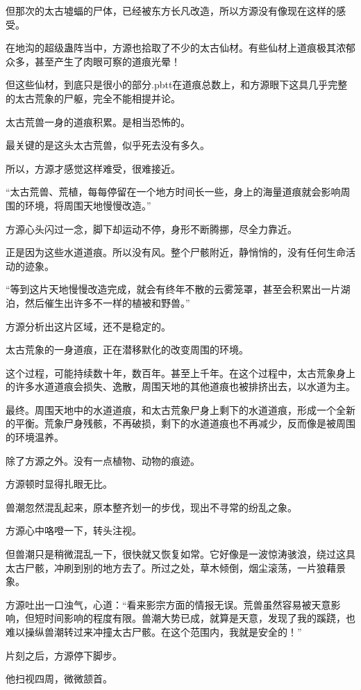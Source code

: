 \begin{this_body}
但那次的太古墟蝠的尸体，已经被东方长凡改造，所以方源没有像现在这样的感受。

在地沟的超级蛊阵当中，方源也拾取了不少的太古仙材。有些仙材上道痕极其浓郁众多，甚至产生了肉眼可察的道痕光晕！

但这些仙材，到底只是很小的部分.pbtt在道痕总数上，和方源眼下这具几乎完整的太古荒象的尸躯，完全不能相提并论。

太古荒兽一身的道痕积累。是相当恐怖的。

最关键的是这头太古荒兽，似乎死去没有多久。

所以，方源才感觉这样难受，很难接近。

“太古荒兽、荒植，每每停留在一个地方时间长一些，身上的海量道痕就会影响周围的环境，将周围天地慢慢改造。”

方源心头闪过一念，脚下却运动不停，身形不断腾挪，尽全力靠近。

正是因为这些水道道痕。所以没有风。整个尸骸附近，静悄悄的，没有任何生命活动的迹象。

“等到这片天地慢慢改造完成，就会有终年不散的云雾笼罩，甚至会积累出一片湖泊，然后催生出许多不一样的植被和野兽。”

方源分析出这片区域，还不是稳定的。

太古荒象的一身道痕，正在潜移默化的改变周围的环境。

这个过程，可能持续数十年，数百年。甚至上千年。在这个过程中，太古荒象身上的许多水道道痕会损失、逸散，周围天地的其他道痕也被排挤出去，以水道为主。

最终。周围天地中的水道道痕，和太古荒象尸身上剩下的水道道痕，形成一个全新的平衡。荒象尸身残骸，不再破损，剩下的水道道痕也不再减少，反而像是被周围的环境温养。

除了方源之外。没有一点植物、动物的痕迹。

方源顿时显得扎眼无比。

兽潮忽然混乱起来，原本整齐划一的步伐，现出不寻常的纷乱之象。

方源心中咯噔一下，转头注视。

但兽潮只是稍微混乱一下，很快就又恢复如常。它好像是一波惊涛骇浪，绕过这具太古尸骸，冲刷到别的地方去了。所过之处，草木倾倒，烟尘滚荡，一片狼藉景象。

方源吐出一口浊气，心道：“看来影宗方面的情报无误。荒兽虽然容易被天意影响，但短时间影响的程度有限。兽潮大势已成，就算是天意，发现了我的蹊跷，也难以操纵兽潮转过来冲撞太古尸骸。在这个范围内，我就是安全的！”

片刻之后，方源停下脚步。

他扫视四周，微微颔首。


\end{this_body}
